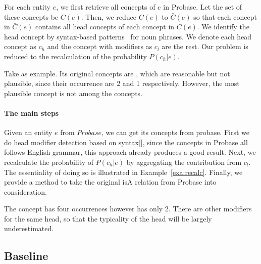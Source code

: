 For each entity $e$, we first retrieve all concepts of $e$ in Probase. Let the set of these concepts be $C(e)$. Then, we reduce $C(e)$ to $\bar{C}(e)$ so that each concept in $\bar{C}(e)$ contains all head concepts of each concept in $C(e)$. We identify the head concept by syntax-based patterns~\cite{ponzetto2007deriving} for noun phrases. We denote each head concept as $c_h$ and the concept with modifiers as $c_{l}$ are the rest. Our problem is reduced to the recalculation of the probability $P({c_h}|e)$.



\begin{example}
\label{exa:HvsO}
Take  as example. Its original concepts are , which are reasonable but not plausible, since their occurrence are 2 and 1 respectively. However, the most plausible concept  is not among the concepts.
\end{example}


\paragraph{The main steps}
Given an entity $e$ from $Probase$, we can get its concepts from probase. First we do head modifier detection based on syntax[], since the concepts in Probase all follows English grammar, this approach already produces a good result. Next, we recalculate the probability of $P({c_h}|e)$ by aggregating the contribution from $c_l$. The essentiality of doing so is illustrated in Example~\ref{exa:recalc}. Finally, we provide a method to take the original isA relation from Probase into consideration.




\begin{example}
\label{exa:recalc}
 The concept  has four occurrences however  has only 2. There are other modifiers for the same head, so that the typicality of the head will be largely underestimated.
\end{example}



\subsection{Baseline}

